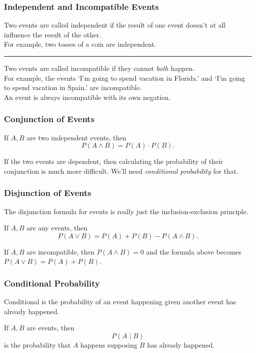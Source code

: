 \documentclass[aspectratio=169,11pt,usenames,dvipsnames,handout]{beamer}
\begin{document}
\begin{frame}
 \frametitle{Independent and Incompatible Events}
 Two events are called \alert{independent} if the result of one event doesn't at
 all influence the result of the other.\pause\\
 For example, two tosses of a coin are independent.\pause\\
 \vspace{2\parskip}
 \hrule
 Two events are called \alert{incompatible} if they cannot \emph{both}
 happen.\pause\\
 For example, the events `I'm going to spend vacation in Florida.' and `I'm
 going to spend vacation in Spain.' are incompatible.\pause\\
 An event is always incompatible with its own negation.
\end{frame}

\begin{frame}
 \frametitle{Conjunction of Events}
 \begin{tcolorbox}[title=Conjunction Formula]
  If $A,B$ are two \alert{independent} events, then
  \[
   P(A \wedge B) = P(A) \cdot P(B).
  \]
 \end{tcolorbox}
 \pause
 If the two events are \alert{dependent}, then calculating the probability of
 their conjunction is much more difficult. We'll need \emph{conditional
 probability} for that.
\end{frame}

\begin{frame}
 \frametitle{Disjunction of Events}
 The disjunction formula for events is really just the inclusion-exclusion
 principle.\pause\\
 \begin{tcolorbox}[title=Disjunction Formula]
  If $A,B$ are any events, then
  \[
   P(A \vee B) = P(A) + P(B) - P(A \wedge B).
  \]
 \end{tcolorbox}
 \pause
 If $A,B$ are \alert{incompatible}, then $P(A \wedge B) = 0$ and the formula
 above becomes $P(A \vee B) = P(A) + P(B)$.
\end{frame}

\begin{frame}
 \frametitle{Conditional Probability}
 Conditional is the probability of an event happening \alert{given another event
 has already happened}.
 \pause
 \begin{tcolorbox}[title=Conditional Probability]
  If $A,B$ are events, then
  \[
   P(A \mid B)
  \]
  is the probability that $A$ happens supposing $B$ has already happened.
 \end{tcolorbox}
\end{frame}
\end{document}
